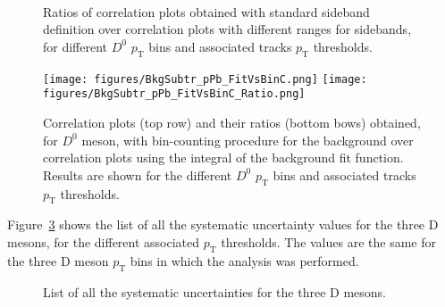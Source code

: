 \begin{figure}
\centering							
{}
 \\
 \\
 \\
 \caption{Ratios of correlation plots obtained with standard sideband definition over correlation plots with different ranges for sidebands, for different
$D^0$ $p_\text{T}$ bins and associated tracks $p_\text{T}$ thresholds.}
\label{fig:Syst_BackSubtr}
\end{figure}

\begin{figure}[!p]
\centering
{\texttt{[image: figures/BkgSubtr\_pPb\_FitVsBinC.png]}} \vspace{1.5cm}
{\texttt{[image: figures/BkgSubtr\_pPb\_FitVsBinC\_Ratio.png]}}
 \caption{Correlation plots (top row) and their ratios (bottom bows) obtained, for $D^0$ meson, with bin-counting procedure for the background over correlation plots using the integral of the background fit function. Results are shown for the different $D^0$ $p_\text{T}$ bins and associated tracks $p_\text{T}$ thresholds.}
 \label{fig:Syst_BackSubtr_2}
\end{figure}

Figure~\ref{fig:SystTable} shows the list of all the systematic uncertainty values for the three D mesons, for the different associated $p_\text{T}$ thresholds. The values are the same for the three D meson $p_\text{T}$ bins in which the analysis was performed.

\begin{figure}
\centering
{}
 \caption{List of all the systematic uncertainties for the three D mesons.} \label{fig:SystTable}
\end{figure}

